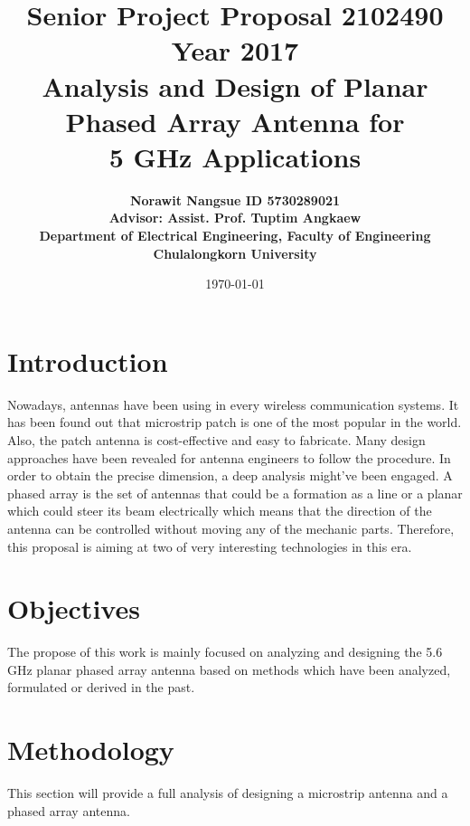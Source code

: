\documentclass[11pt,a4paper]{article}
\title{
  \textbf{Senior Project Proposal 2102490 Year 2017}  \\[2ex]
  Analysis and Design of Planar Phased Array Antenna for \\[1ex]
  5 GHz Applications
}
\author{\textbf{Norawit Nangsue ID 5730289021} \\[1ex]
\textbf{Advisor: Assist. Prof. Tuptim Angkaew} \\[1ex]
\textbf{Department of Electrical Engineering, Faculty of Engineering} \\[1ex]
\textbf{Chulalongkorn University}
}
\date{\today}
\begin{document}
  \maketitle
  \tableofcontents
  \newpage
  \section{Introduction}
    \indent Nowadays, antennas have been using in every wireless communication systems. It has been found out that microstrip patch is one of the most popular\cite{AkS} in the world. Also, the patch antenna is cost-effective and easy to fabricate\cite{AtT}. Many design approaches have been revealed for antenna engineers to follow the procedure. In order to obtain the precise dimension, a deep analysis might've been engaged.
    \indent A phased array is the set of antennas that could be a formation as a line or a planar which could steer its beam electrically\cite{CoB:05} which means that the direction of the antenna can be controlled without moving any of the mechanic parts. Therefore, this proposal is aiming at two of very interesting technologies in this era.

  \section{Objectives}
    \indent The propose of this work is mainly focused on analyzing and designing the 5.6 GHz planar phased array antenna based on methods which have been analyzed, formulated or derived in the past. 

  \section{Methodology}
    \indent This section will provide a full analysis of designing a microstrip antenna and a phased array antenna.
\end{document}

